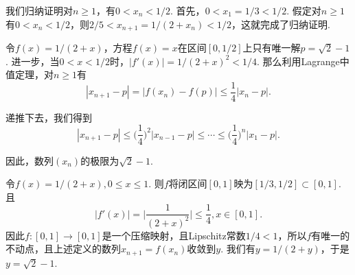 \begin{ans}
  \method 我们归纳证明对$n\ge1$，有$0<x_n<1/2$. 首先，$0<x_1=1/3<1/2$. 假定对$n\ge1$有$0<x_n<1/2$，则$2/5<x_{n+1}=1/(2+x_n)<1/2$，这就完成了归纳证明.

  令$f(x)=1/(2+x)$，方程$f(x)=x$在区间$[0,1/2]$上只有唯一解$p=\sqrt2-1$. 进一步，当$0<x<1/2$时，$|f'(x)|=1/(2+x)^2<1/4$. 那么利用Lagrange中值定理，对$n\ge1$有
  \[ |x_{n+1}-p|=|f(x_n)-f(p)|\le\frac14|x_n-p|.\]

  递推下去，我们得到
  \[ |x_{n+1}-p|\le\Big(\frac14\Big)^2|x_{n-1}-p|
  \le\cdots\le\Big(\frac14\Big)^n|x_1-p|. \]

  因此，数列$(x_n)$的极限为$\sqrt2-1$.

  \method 令$f(x)=1/(2+x),0\le x\le1$. 则$f$将闭区间$[0,1]$映为$[1/3,1/2]\subset[0,1]$. 且
  \[ |f'(x)|=\bigg|\frac1{(2+x)^2}\bigg|\le\frac14,x\in[0,1]. \]
  因此$f:[0,1]\to[0,1]$是一个压缩映射，且Lipschitz常数$1/4<1$，所以$f$有唯一的不动点，且上述定义的数列$x_{n+1}=f(x_n)$收敛到$y$. 我们有$y=1/(2+y)$，于是$y=\sqrt2-1$.
\end{ans}

